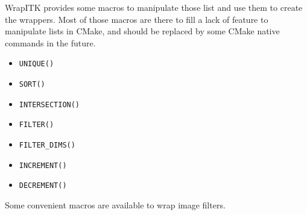 \documentclass{InsightArticle}
\begin{document}
WrapITK provides some macros to manipulate those list and use them
to create the wrappers. Most of those macros are there to fill a lack
of feature to manipulate lists in CMake, and should be replaced by
some CMake native commands in the future.

\begin{itemize}
  \item \verb$UNIQUE()$

  \item \verb$SORT()$

  \item \verb$INTERSECTION()$

  \item \verb$FILTER()$

  \item \verb$FILTER_DIMS()$

  \item \verb$INCREMENT()$

  \item \verb$DECREMENT()$

\end{itemize}


Some convenient macros are available to wrap image filters.
\end{document}
